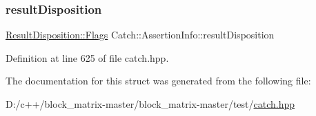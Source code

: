 \subsubsection{\texorpdfstring{result\+Disposition}{resultDisposition}}
{\footnotesize\ttfamily \mbox{\hyperlink{struct_catch_1_1_result_disposition_a3396cad6e2259af326b3aae93e23e9d8}{Result\+Disposition\+::\+Flags}} Catch\+::\+Assertion\+Info\+::result\+Disposition}



Definition at line 625 of file catch.\+hpp.



The documentation for this struct was generated from the following file\+:\begin{DoxyCompactItemize}
\item 
D\+:/c++/block\+\_\+matrix-\/master/block\+\_\+matrix-\/master/test/\mbox{\hyperlink{catch_8hpp}{catch.\+hpp}}\end{DoxyCompactItemize}
